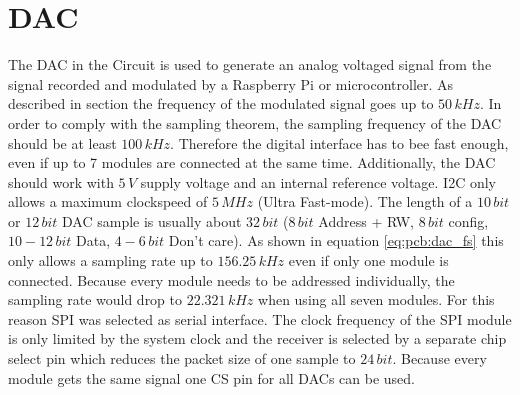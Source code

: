 \section{DAC}
%
%
The DAC in the Circuit is used to generate an analog voltaged signal from the signal recorded and modulated by a Raspberry Pi or microcontroller.\p
%
As described in section  the frequency of the modulated signal goes up to $50\,kHz$.
In order to comply with the sampling theorem, the sampling frequency of the DAC should be at least $100\,kHz$. Therefore the digital interface has to bee fast enough, even if up to 7 modules are connected at the same time. Additionally, the DAC should work with $5\,V$ supply voltage and an internal reference voltage.\p
%
I2C only allows a maximum clockspeed of $5\,MHz$ (Ultra Fast-mode).\cite{nxp_i2c-bus_2021} The length of a $10\,bit$ or $12\,bit$ DAC sample is usually about $32\,bit$ ($8\,bit$ Address + RW, $8\,bit$ config, $10 - 12\,bit$ Data, $4 - 6\,bit$ Don't care). As shown in equation \ref{eq:pcb:dac_fs} this only allows a sampling rate up to $156.25\,kHz$ even if only one module is connected. Because every module needs to be addressed individually, the sampling rate would drop to $22.321\,kHz$ when using all seven modules. For this reason SPI was selected as serial interface. The clock frequency of the SPI module is only limited by the system clock and the receiver is selected by a separate chip select pin which reduces the packet size of one sample to $24\,bit$. Because every module gets the same signal one CS pin for all DACs can be used.\p
%
